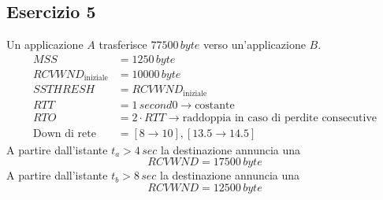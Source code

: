 \documentclass[a4paper]{article}
\begin{document}
\subsection{Esercizio 5}
Un applicazione \( A \) trasferisce \( 77500 \,byte\) verso un'applicazione \( B \).
\[
\begin{aligned}
  MSS &= 1250 \,byte\\
  RCVWND_{\text{iniziale}} &= 10000 \,byte\\
  SSTHRESH &= RCVWND_{\text{iniziale}}\\
  RTT &= 1 \,second0 \to \text{costante}\\
  RTO &= 2 \cdot RTT \to \text{raddoppia in caso di perdite consecutive}\\
  \text{Down di rete} &= [8 \to 10],[13.5 \to 14.5]
\end{aligned}
\]
A partire dall'istante \( t_a > 4\,sec \) la destinazione annuncia una
\[
  RCVWND = 17500\,byte
\]
A partire dall'istante \( t_b > 8\,sec \) la destinazione annuncia una
\[
  RCVWND = 12500\,byte
\] 
\end{document}
